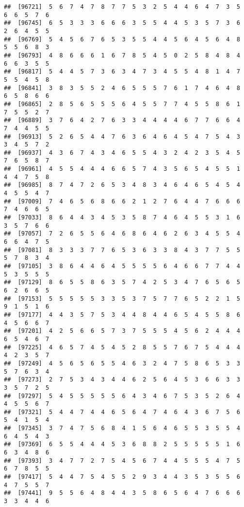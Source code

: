 \documentclass[
]{book}
\begin{document}
\begin{verbatim}
##  [96721]  5  6  7  4  7  8  7  7  5  3  2  5  4  4  6  4  7  3  5  6  6  5  7  6
##  [96745]  6  5  3  3  3  6  6  6  3  5  5  4  4  5  3  5  7  3  6  2  6  4  5  5
##  [96769]  5  4  5  6  7  6  5  3  5  5  4  4  5  6  4  5  6  4  8  5  5  6  8  3
##  [96793]  4  8  6  6  6  1  6  7  8  5  4  5  0  2  5  8  4  8  4  6  6  3  5  5
##  [96817]  5  4  4  5  7  3  6  3  4  7  3  4  5  5  4  8  1  4  7  5  5  4  5  8
##  [96841]  3  8  3  5  5  2  4  6  5  5  5  7  6  1  7  4  6  4  8  6  5  8  6  6
##  [96865]  2  8  5  6  5  5  5  6  4  5  5  7  7  4  5  5  8  6  1  7  5  5  2  7
##  [96889]  3  7  6  4  2  7  6  3  3  4  4  4  4  6  7  7  6  6  4  7  4  4  5  5
##  [96913]  5  2  6  5  4  4  7  6  3  6  4  6  4  5  4  7  5  4  3  3  4  5  7  2
##  [96937]  4  3  6  7  4  3  4  6  5  5  4  3  2  4  2  3  5  4  5  7  6  5  8  7
##  [96961]  4  5  5  4  4  4  6  6  5  7  4  3  5  6  5  4  5  5  1  4  4  7  5  8
##  [96985]  8  7  4  7  2  6  5  3  4  8  3  4  6  4  6  5  4  5  4  4  5  5  4  7
##  [97009]  7  4  6  5  6  8  6  6  2  1  2  7  6  4  4  7  6  6  6  7  4  6  6  5
##  [97033]  8  6  4  4  3  4  5  3  5  8  7  4  6  4  5  5  3  1  6  3  5  7  6  6
##  [97057]  7  2  6  5  5  6  4  6  8  6  4  6  2  6  3  4  5  5  4  6  6  4  7  5
##  [97081]  8  3  3  3  7  7  6  5  3  6  3  3  8  4  3  7  7  5  5  5  7  8  3  4
##  [97105]  3  8  6  4  4  6  4  5  5  5  5  6  4  6  6  7  7  4  4  5  3  5  5  5
##  [97129]  8  6  5  5  8  6  3  5  7  4  2  5  3  4  7  6  5  6  5  6  2  6  6  5
##  [97153]  5  5  5  5  5  3  3  5  3  7  5  7  7  6  5  2  2  1  5  9  1  5  1  6
##  [97177]  4  4  3  5  7  5  3  4  4  8  4  4  6  5  4  5  5  8  6  4  5  6  6  7
##  [97201]  4  2  5  6  6  5  7  3  7  5  5  5  4  5  6  2  4  4  4  6  5  4  6  7
##  [97225]  4  6  5  7  4  5  4  5  2  8  5  5  7  6  7  5  4  4  4  4  2  3  5  7
##  [97249]  4  5  6  5  6  5  5  4  6  3  2  4  7  5  8  6  5  3  3  5  7  6  3  4
##  [97273]  2  7  5  3  4  3  4  4  6  2  5  6  4  5  3  6  6  3  3  3  5  7  2  5
##  [97297]  5  4  5  5  5  5  5  6  4  3  4  6  7  5  3  5  2  6  4  4  5  5  6  7
##  [97321]  5  4  4  7  4  4  6  5  6  4  7  4  6  4  3  6  7  5  6  5  4  1  5  4
##  [97345]  3  7  4  7  5  6  8  4  1  5  6  4  6  5  5  3  5  5  4  6  4  5  4  3
##  [97369]  6  5  5  4  4  4  5  3  6  8  8  2  5  5  5  5  5  1  6  6  3  4  8  6
##  [97393]  3  4  7  7  2  7  5  4  5  6  7  4  4  5  5  5  4  7  5  6  7  8  5  5
##  [97417]  5  4  4  7  5  4  5  5  2  9  3  4  4  3  5  3  5  5  6  4  7  5  5  7
##  [97441]  9  5  5  6  4  8  4  4  3  5  8  6  5  6  4  7  6  6  6  3  3  4  4  6

\end{verbatim}
\end{document}
